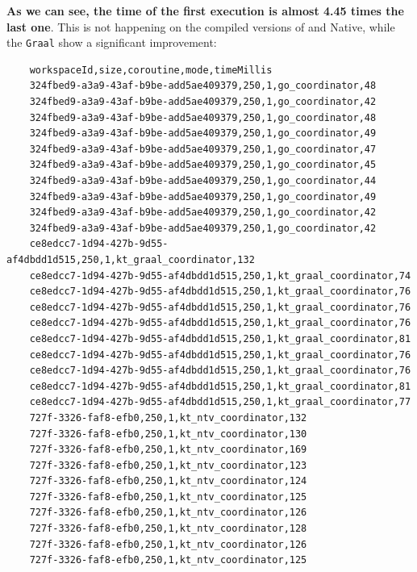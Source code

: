 \textbf{As we can see, the time of the first execution is almost 4.45 times the last one}. This is not happening on the compiled versions of \Go and \Kotlin Native, while the \texttt{Graal} show a significant improvement:

\begin{lstlisting}
	workspaceId,size,coroutine,mode,timeMillis
	324fbed9-a3a9-43af-b9be-add5ae409379,250,1,go_coordinator,48
	324fbed9-a3a9-43af-b9be-add5ae409379,250,1,go_coordinator,42
	324fbed9-a3a9-43af-b9be-add5ae409379,250,1,go_coordinator,48
	324fbed9-a3a9-43af-b9be-add5ae409379,250,1,go_coordinator,49
	324fbed9-a3a9-43af-b9be-add5ae409379,250,1,go_coordinator,47
	324fbed9-a3a9-43af-b9be-add5ae409379,250,1,go_coordinator,45
	324fbed9-a3a9-43af-b9be-add5ae409379,250,1,go_coordinator,44
	324fbed9-a3a9-43af-b9be-add5ae409379,250,1,go_coordinator,49
	324fbed9-a3a9-43af-b9be-add5ae409379,250,1,go_coordinator,42
	324fbed9-a3a9-43af-b9be-add5ae409379,250,1,go_coordinator,42
	ce8edcc7-1d94-427b-9d55-af4dbdd1d515,250,1,kt_graal_coordinator,132
	ce8edcc7-1d94-427b-9d55-af4dbdd1d515,250,1,kt_graal_coordinator,74
	ce8edcc7-1d94-427b-9d55-af4dbdd1d515,250,1,kt_graal_coordinator,76
	ce8edcc7-1d94-427b-9d55-af4dbdd1d515,250,1,kt_graal_coordinator,76
	ce8edcc7-1d94-427b-9d55-af4dbdd1d515,250,1,kt_graal_coordinator,76
	ce8edcc7-1d94-427b-9d55-af4dbdd1d515,250,1,kt_graal_coordinator,81
	ce8edcc7-1d94-427b-9d55-af4dbdd1d515,250,1,kt_graal_coordinator,76
	ce8edcc7-1d94-427b-9d55-af4dbdd1d515,250,1,kt_graal_coordinator,76
	ce8edcc7-1d94-427b-9d55-af4dbdd1d515,250,1,kt_graal_coordinator,81
	ce8edcc7-1d94-427b-9d55-af4dbdd1d515,250,1,kt_graal_coordinator,77
	727f-3326-faf8-efb0,250,1,kt_ntv_coordinator,132
	727f-3326-faf8-efb0,250,1,kt_ntv_coordinator,130
	727f-3326-faf8-efb0,250,1,kt_ntv_coordinator,169
	727f-3326-faf8-efb0,250,1,kt_ntv_coordinator,123
	727f-3326-faf8-efb0,250,1,kt_ntv_coordinator,124
	727f-3326-faf8-efb0,250,1,kt_ntv_coordinator,125
	727f-3326-faf8-efb0,250,1,kt_ntv_coordinator,126
	727f-3326-faf8-efb0,250,1,kt_ntv_coordinator,128
	727f-3326-faf8-efb0,250,1,kt_ntv_coordinator,126
	727f-3326-faf8-efb0,250,1,kt_ntv_coordinator,125
\end{lstlisting}

